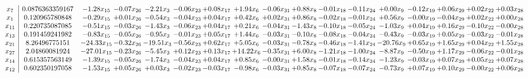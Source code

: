 \documentclass[9pt]{article}
\begin{document}
 \[\begin{array}{c| c c@{\hskip 2pt} c@{\hskip 2pt} c@{\hskip 2pt} c@{\hskip 2pt} c@{\hskip 2pt} c@{\hskip 2pt} c@{\hskip 2pt} c@{\hskip 2pt} c@{\hskip 2pt} c@{\hskip 2pt} c@{\hskip 2pt} c@{\hskip 2pt} c@{\hskip 2pt} c@{\hskip 2pt} c@{\hskip 2pt} }
 x_{7}   &  0.0876363359167 & -1.28 x_{15} & -0.07 x_{26} & -2.21 x_{3} & -0.06 x_{23} & +  0.08 x_{17} & +  1.94 x_{6} & -0.06 x_{31} & +  0.88 x_{8} & -0.01 x_{18} & -0.11 x_{24} & +  0.00 x_{9} & -0.12 x_{19} & +  0.06 x_{29} & +  0.02 x_{22} & +  0.03 x_{28}\\
 x_{1}   &  0.120965780848 & -0.29 x_{15} & +  0.01 x_{26} & -0.54 x_{3} & -0.04 x_{23} & +  0.04 x_{17} & +  0.42 x_{6} & +  0.02 x_{31} & +  0.86 x_{8} & -0.02 x_{18} & -0.01 x_{24} & +  0.56 x_{9} & -0.00 x_{19} & -0.04 x_{29} & +  0.02 x_{22} & +  0.00 x_{28}\\
 x_{11}   &  0.220735087085 & -0.51 x_{15} & -0.03 x_{26} & -1.43 x_{3} & -0.06 x_{23} & +  0.04 x_{17} & +  0.21 x_{6} & -0.04 x_{31} & -1.43 x_{8} & -0.10 x_{18} & -0.05 x_{24} & -1.03 x_{9} & +  0.04 x_{19} & +  0.16 x_{29} & -0.10 x_{22} & -0.00 x_{28}\\
 x_{13}   &  0.191459241982 & -0.83 x_{15} & -0.05 x_{26} & -0.95 x_{3} & -0.01 x_{23} & +  0.05 x_{17} & +  1.44 x_{6} & -0.03 x_{31} & -0.10 x_{8} & -0.08 x_{18} & -0.04 x_{24} & -0.43 x_{9} & -0.03 x_{19} & +  0.05 x_{29} & -0.03 x_{22} & -0.01 x_{28}\\
 x_{21}   &  8.26496775151 & -24.33 x_{15} & -0.32 x_{26} & -19.51 x_{3} & -0.56 x_{23} & +  0.62 x_{17} & +  5.05 x_{6} & -0.03 x_{31} & -0.78 x_{8} & -0.46 x_{18} & -1.41 x_{24} & -20.76 x_{9} & +  0.65 x_{19} & +  1.65 x_{29} & +  0.04 x_{22} & +  1.55 x_{28}\\
 x_{27}   &  2.04860081924 & -27.01 x_{15} & -0.23 x_{26} & -5.45 x_{3} & +  0.12 x_{23} & +  0.13 x_{17} & + 14.22 x_{6} & -0.35 x_{31} & +  6.00 x_{8} & -1.21 x_{18} & -1.00 x_{24} & -8.87 x_{9} & -0.50 x_{19} & +  1.17 x_{29} & -0.06 x_{22} & -0.01 x_{28}\\
 x_{14}   &  0.615357563149 & -1.39 x_{15} & -0.05 x_{26} & -1.74 x_{3} & -0.04 x_{23} & +  0.04 x_{17} & +  0.85 x_{6} & -0.00 x_{31} & +  1.58 x_{8} & -0.01 x_{18} & -0.14 x_{24} & -1.23 x_{9} & -0.03 x_{19} & +  0.07 x_{29} & +  0.05 x_{22} & +  0.07 x_{28}\\
 x_{12}   &  0.602350197058 & -1.53 x_{15} & +  0.05 x_{26} & +  0.03 x_{3} & -0.02 x_{23} & -0.03 x_{17} & -0.98 x_{6} & -0.03 x_{31} & +  0.85 x_{8} & -0.07 x_{18} & -0.07 x_{24} & -0.73 x_{9} & +  0.07 x_{19} & +  0.10 x_{29} & -0.00 x_{22} & +  0.06 x_{28}\\

\end{array}\]
\end{document}
